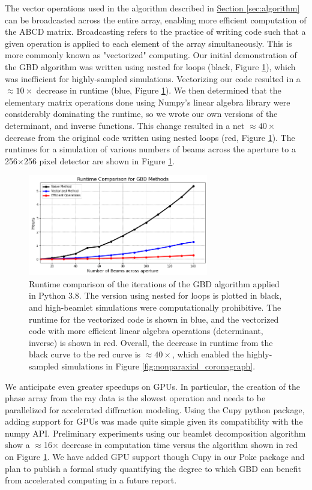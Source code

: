 The vector operations used in the algorithm described in \hyperref[sec:algorithm]{Section \ref{sec:algorithm}} can be broadcasted across the entire array, enabling more efficient computation of the ABCD matrix. Broadcasting refers to the practice of writing code such that a given operation is applied to each element of the array simultaneously. This is more commonly known as "vectorized" computing. Our initial demonstration of the GBD algorithm was written using nested for loops (black, Figure \ref{fig:runtime_compare}), which was inefficient for highly-sampled simulations. Vectorizing our code resulted in a $\approx10\times$ decrease in runtime (blue, Figure \ref{fig:runtime_compare}). We then determined that the elementary matrix operations done using Numpy's linear algebra library were considerably dominating the runtime, so we wrote our own versions of the determinant, and inverse functions. This change resulted in a net $\approx40\times$ decrease from the original code written using nested loops (red, Figure \ref{fig:runtime_compare}). The runtimes for a simulation of various numbers of beams across the aperture to a 256$\times$256 pixel detector are shown in Figure \ref{fig:runtime_compare}.
\begin{figure}[H]
    \centering
    \includegraphics[width=0.7\textwidth]{runtime_vs_beamlets.png}
    \caption{Runtime comparison of the iterations of the GBD algorithm applied in Python 3.8. The version using nested for loops is plotted in black, and high-beamlet simulations were computationally prohibitive. The runtime for the vectorized code is shown in blue, and the vectorized code with more efficient linear algebra operations (determinant, inverse) is shown in red. Overall, the decrease in runtime from the black curve to the red curve is $\approx 40\times$, which enabled the highly-sampled simulations in Figure \ref{fig:nonparaxial_coronagraph}.}
    \label{fig:runtime_compare}
\end{figure}

We anticipate even greater speedups on GPUs. In particular, the creation of the phase array from the ray data is the slowest operation and needs to be parallelized for accelerated diffraction modeling. Using the Cupy python package, adding support for GPUs was made quite simple given its compatibility with the numpy API. Preliminary experiments using our beamlet decomposition algorithm show a $\approx$16$\times$ decrease in computation time versus the algorithm shown in red on Figure \ref{fig:runtime_compare}. We have added GPU support though Cupy in our Poke package and plan to publish a formal study quantifying the degree to which GBD can benefit from accelerated computing in a future report.

